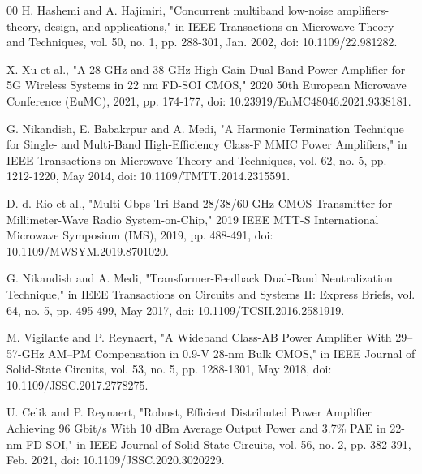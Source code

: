 \documentclass{IEEEtran}
\begin{document}
\begin{thebibliography}{00}
H. Hashemi and A. Hajimiri, "Concurrent multiband low-noise amplifiers-theory, design, and applications," in IEEE Transactions on Microwave Theory and Techniques, vol. 50, no. 1, pp. 288-301, Jan. 2002, doi: 10.1109/22.981282.



X. Xu et al., "A 28 GHz and 38 GHz High-Gain Dual-Band Power Amplifier for 5G Wireless Systems in 22 nm FD-SOI CMOS," 2020 50th European Microwave Conference (EuMC), 2021, pp. 174-177, doi: 10.23919/EuMC48046.2021.9338181.


G. Nikandish, E. Babakrpur and A. Medi, "A Harmonic Termination Technique for Single- and Multi-Band High-Efficiency Class-F MMIC Power Amplifiers," in IEEE Transactions on Microwave Theory and Techniques, vol. 62, no. 5, pp. 1212-1220, May 2014, doi: 10.1109/TMTT.2014.2315591.

D. d. Rio et al., "Multi-Gbps Tri-Band 28/38/60-GHz CMOS Transmitter for Millimeter-Wave Radio System-on-Chip," 2019 IEEE MTT-S International Microwave Symposium (IMS), 2019, pp. 488-491, doi: 10.1109/MWSYM.2019.8701020.



G. Nikandish and A. Medi, "Transformer-Feedback Dual-Band Neutralization Technique," in IEEE Transactions on Circuits and Systems II: Express Briefs, vol. 64, no. 5, pp. 495-499, May 2017, doi: 10.1109/TCSII.2016.2581919.


M. Vigilante and P. Reynaert, "A Wideband Class-AB Power Amplifier With 29–57-GHz AM–PM Compensation in 0.9-V 28-nm Bulk CMOS," in IEEE Journal of Solid-State Circuits, vol. 53, no. 5, pp. 1288-1301, May 2018, doi: 10.1109/JSSC.2017.2778275.


U. Celik and P. Reynaert, "Robust, Efficient Distributed Power Amplifier Achieving 96 Gbit/s With 10 dBm Average Output Power and 3.7\% PAE in 22-nm FD-SOI," in IEEE Journal of Solid-State Circuits, vol. 56, no. 2, pp. 382-391, Feb. 2021, doi: 10.1109/JSSC.2020.3020229.



\end{thebibliography}
\end{document}
